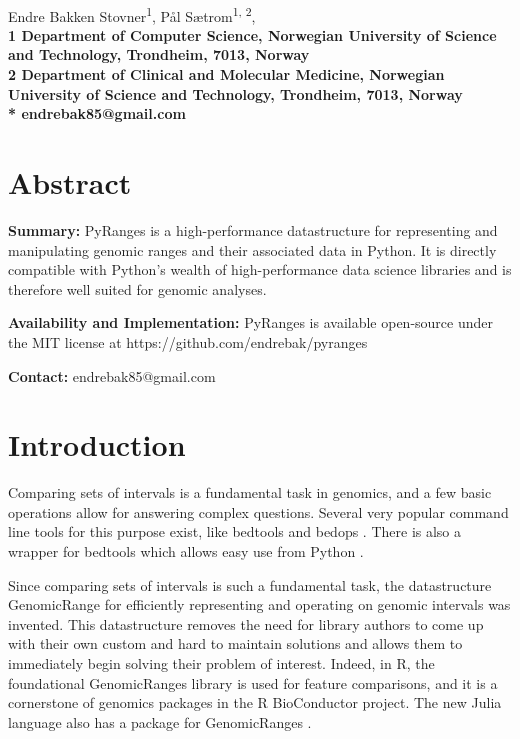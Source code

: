 \documentclass[10pt,letterpaper]{article}
\begin{document}
\vspace*{0.35in}

\begin{flushleft}
{\Large
  \textbf{}
}
\newline
\\
Endre Bakken Stovner\textsuperscript{1},
Pål Sætrom\textsuperscript{1, 2},
\\
\bf{1} Department of
  Computer Science, Norwegian University
  of Science and Technology, Trondheim, 7013, Norway
\\
\bf{2} Department of Clinical and Molecular Medicine, Norwegian
  University of Science and Technology, Trondheim, 7013, Norway
\\
\bigskip
* endrebak85@gmail.com

\end{flushleft}

\section*{Abstract}

\textbf{Summary:} PyRanges is a high-performance datastructure for representing
and manipulating genomic ranges and their associated data in Python. It is
directly compatible with Python's wealth of high-performance data science
libraries and is therefore well suited for genomic analyses.

\textbf{Availability and Implementation:} PyRanges is available open-source under
the MIT license at https://github.com/endrebak/pyranges

\textbf{Contact:} endrebak85@gmail.com

\section*{Introduction}

Comparing sets of intervals is a fundamental task in genomics, and a few basic
operations allow for answering complex questions. Several very popular command
line tools for this purpose exist, like bedtools
\cite{doi:10.1093/bioinformatics/btq033} and bedops
\cite{doi:10.1093/bioinformatics/bts277}. There is also a wrapper for bedtools
which allows easy use from Python \cite{doi:10.1093/bioinformatics/btr539}.

Since comparing sets of intervals is such a fundamental task, the datastructure
GenomicRange for efficiently representing and operating on genomic intervals was
invented. This datastructure removes the need for library authors to come up
with their own custom and hard to maintain solutions and allows them to
immediately begin solving their problem of interest. Indeed, in R, the
foundational GenomicRanges library \cite{10.1371/journal.pcbi.1003118} is used
for feature comparisons, and it is a cornerstone of genomics packages in the R
BioConductor \cite{Gentleman2004} project. The new Julia language
\cite{doi:10.1137/141000671} also has a package for GenomicRanges
\cite{Haverty2017}.
\end{document}
